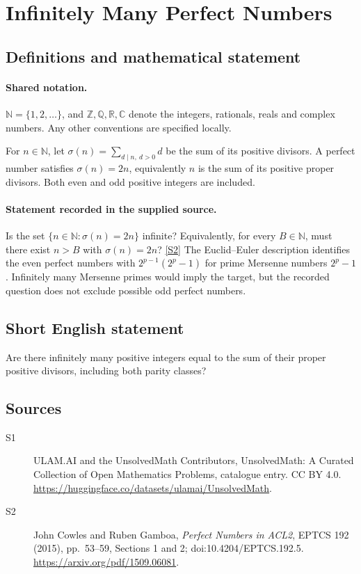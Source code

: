 \documentclass[11pt]{article}
\newcommand{\sref}[2]{\hyperlink{source:#1:#2}{[S#2]}}
\begin{document}
\section{Infinitely Many Perfect Numbers}\label{statement}

\subsection{Definitions and mathematical statement}

\paragraph{Shared notation.}$\mathbb N=\{1,2,\ldots\}$, and $\mathbb Z,\mathbb Q,\mathbb R,\mathbb C$ denote the integers, rationals, reals and complex numbers. Any other conventions are specified locally.


For $n\in\mathbb N$, let $\sigma(n)=\sum_{d\mid n,\ d>0}d$ be the sum of its positive divisors. A perfect number satisfies $\sigma(n)=2n$, equivalently $n$ is the sum of its positive proper divisors. Both even and odd positive integers are included.
\paragraph{Statement recorded in the supplied source.}
Is the set $\{n\in\mathbb N:\sigma(n)=2n\}$ infinite? Equivalently, for every $B\in\mathbb N$, must there exist $n>B$ with $\sigma(n)=2n$? \sref{statement}{2}
The Euclid--Euler description identifies the even perfect numbers with $2^{p-1}(2^p-1)$ for prime Mersenne numbers $2^p-1$. Infinitely many Mersenne primes would imply the target, but the recorded question does not exclude possible odd perfect numbers.
\subsection{Short English statement}
Are there infinitely many positive integers equal to the sum of their proper positive divisors, including both parity classes?
\subsection{Sources}
\begin{description}
\item[\hypertarget{source:statement:1}{S1}] ULAM.AI and the UnsolvedMath Contributors, UnsolvedMath: A Curated Collection of Open Mathematics Problems, catalogue entry. CC BY 4.0. \url{https://huggingface.co/datasets/ulamai/UnsolvedMath}.
\item[\hypertarget{source:statement:2}{S2}] John Cowles and Ruben Gamboa, \emph{Perfect Numbers in ACL2}, EPTCS 192 (2015), pp.\ 53--59, Sections 1 and 2; doi:10.4204/EPTCS.192.5. \url{https://arxiv.org/pdf/1509.06081}.
\end{description}
\label{end:statement}
\end{document}
